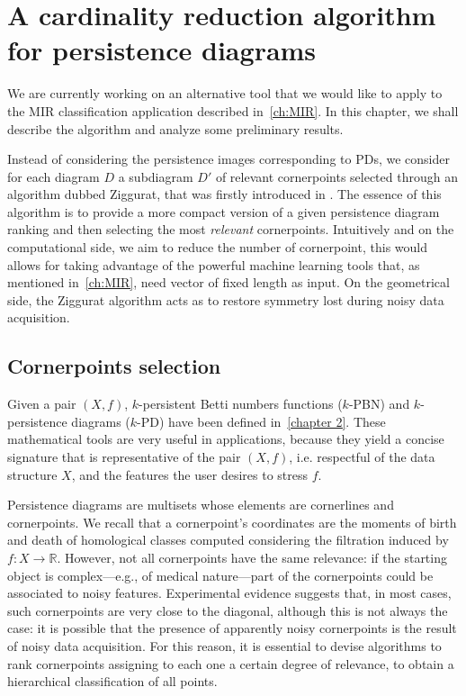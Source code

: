 \documentclass[english, LaM, oneside, noexaminfo]{sapthesis}
\begin{document}
\chapter{A cardinality reduction algorithm for persistence diagrams}\label{ch:Ziggurat}

We are currently working on an alternative tool that we would like to apply to the MIR classification application described in~\cref{ch:MIR}. In this chapter, we shall describe the algorithm and analyze some preliminary results.

Instead of considering the persistence images corresponding to PDs, we consider for each diagram $D$ a subdiagram $D'$ of relevant cornerpoints selected through an algorithm dubbed Ziggurat, that was firstly introduced in \cite{student01_my_bachel}. 
The essence of this algorithm is to provide a more compact version of a given persistence diagram ranking and then selecting the most \textit{relevant} cornerpoints. Intuitively and on the computational side, we aim to reduce the number of cornerpoint, this would allows for taking advantage of the powerful machine learning tools that, as mentioned in~\cref{ch:MIR}, need vector of fixed length as input. On the geometrical side, the Ziggurat algorithm acts as to restore symmetry lost during noisy data acquisition.

\section{Cornerpoints selection}
\label{Cornerpoint selection}

Given a pair $(X, f)$, $k$-persistent Betti numbers functions ($k$-PBN) and $k$-persistence diagrams
($k$-PD) have been defined in~\cref{chapter 2}. These mathematical tools are very useful in applications, because they yield a concise signature that is representative of the pair $(X,f)$, i.e. respectful of the data structure $X$, and the features the user desires to stress $f$.

Persistence diagrams are multisets whose elements are cornerlines and cornerpoints. We recall that a cornerpoint's coordinates are the moments of birth and death of homological classes computed considering the filtration induced by $f:X\rightarrow\mathbb{R}$.
However, not all cornerpoints have the same relevance: if the starting object is complex---e.g., of  medical nature---part of the cornerpoints could be associated to noisy features.
Experimental evidence suggests that, in most cases, such cornerpoints are very close to the diagonal, although this is not always the case: it is possible that the presence of apparently noisy cornerpoints is the result of noisy data acquisition.
For this reason, it is essential to devise algorithms to rank cornerpoints assigning to each one a certain degree of relevance, to obtain a hierarchical classification of all points.
\end{document}
